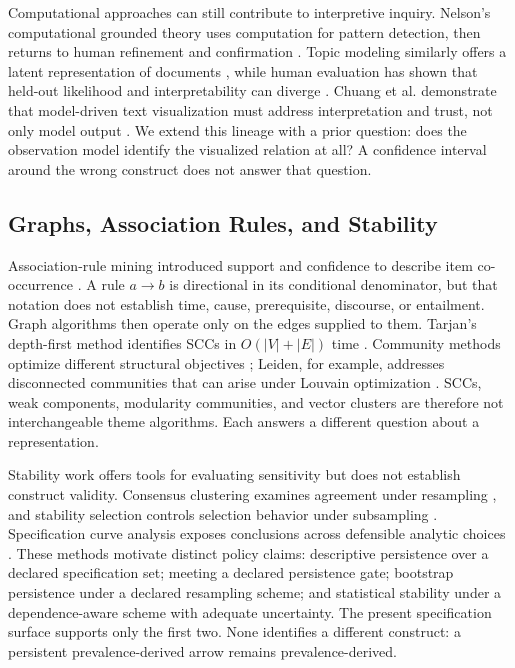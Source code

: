 \documentclass[manuscript,screen,review,anonymous]{acmart}
\begin{document}
Computational approaches can still contribute to interpretive inquiry. Nelson's computational grounded theory uses computation for pattern detection, then returns to human refinement and confirmation \cite{nelson2020}. Topic modeling similarly offers a latent representation of documents \cite{blei2003}, while human evaluation has shown that held-out likelihood and interpretability can diverge \cite{chang2009}. Chuang et al. demonstrate that model-driven text visualization must address interpretation and trust, not only model output \cite{chuang2012}. We extend this lineage with a prior question: does the observation model identify the visualized relation at all? A confidence interval around the wrong construct does not answer that question.

\subsection{Graphs, Association Rules, and Stability}

Association-rule mining introduced support and confidence to describe item co-occurrence \cite{agrawal1993}. A rule $a\rightarrow b$ is directional in its conditional denominator, but that notation does not establish time, cause, prerequisite, discourse, or entailment. Graph algorithms then operate only on the edges supplied to them. Tarjan's depth-first method identifies SCCs in $O(|V|+|E|)$ time \cite{tarjan1972}. Community methods optimize different structural objectives \cite{newman2004}; Leiden, for example, addresses disconnected communities that can arise under Louvain optimization \cite{traag2019}. SCCs, weak components, modularity communities, and vector clusters are therefore not interchangeable theme algorithms. Each answers a different question about a representation.

Stability work offers tools for evaluating sensitivity but does not establish construct validity. Consensus clustering examines agreement under resampling \cite{monti2003}, and stability selection controls selection behavior under subsampling \cite{meinshausen2010}. Specification curve analysis exposes conclusions across defensible analytic choices \cite{simonsohn2020}. These methods motivate distinct policy claims: descriptive persistence over a declared specification set; meeting a declared persistence gate; bootstrap persistence under a declared resampling scheme; and statistical stability under a dependence-aware scheme with adequate uncertainty. The present specification surface supports only the first two. None identifies a different construct: a persistent prevalence-derived arrow remains prevalence-derived.
\end{document}
